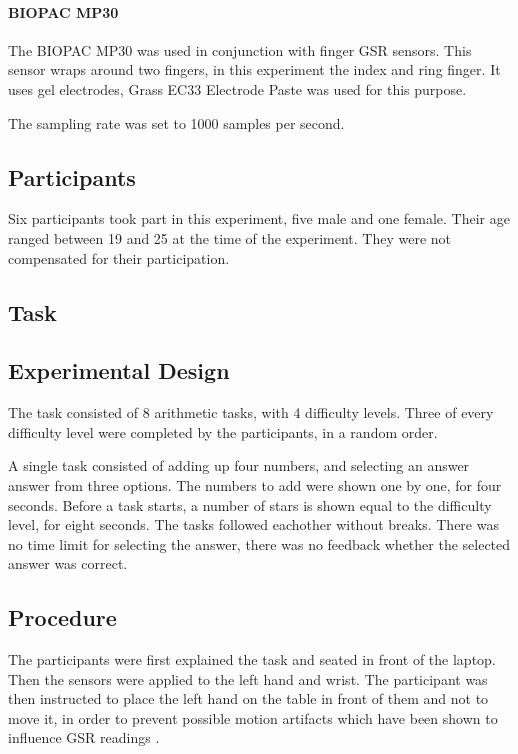 \documentclass[11pt,leqno,a4paper]{report} %
\begin{document}
\paragraph{BIOPAC MP30}
The BIOPAC MP30 was used in conjunction with finger GSR sensors. This sensor wraps around two fingers, in this experiment the index and ring finger. It uses gel electrodes, Grass EC33 Electrode Paste was used for this purpose.

The sampling rate was set to 1000 samples per second.

\subsection{Participants}
Six participants took part in this experiment, five male and one female. Their age ranged between 19 and 25 at the time of the experiment. They were not compensated for their participation.


\subsection{Task}

\subsection{Experimental Design}
The task consisted of 8 arithmetic tasks, with 4 difficulty levels. Three of every difficulty level were completed by the participants, in a random order. 

A single task consisted of adding up four numbers, and selecting an answer answer from three options. The numbers to add were shown one by one, for four seconds. Before a task starts, a number of stars is shown equal to the difficulty level, for eight seconds. The tasks followed eachother without breaks. There was no time limit for selecting the answer, there was no feedback whether the selected answer was correct.


\subsection{Procedure}
The participants were first explained the task and seated in front of the laptop. Then the sensors were applied to the left hand and wrist. The participant was then instructed to place the left hand on the table in front of them and not to move it, in order to prevent possible motion artifacts which have been shown to influence GSR readings \citep{motionart}.
\end{document}
